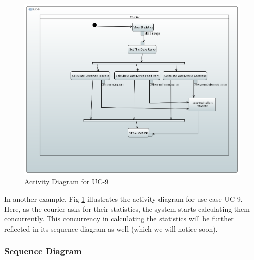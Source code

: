\begin{figure}[h!]
\begin{center}
\includegraphics[scale=0.35]{FIGS/UC-9.PNG}
    \caption{Activity Diagram for UC-9}
    \label{fig:act_diag9}
\end{center}
\end{figure}

In another example, Fig \ref{fig:act_diag9} illustrates the activity diagram for use case UC-9. Here, as the courier asks for their statistics, the system starts calculating them concurrently. This concurrency in calculating the statistics will be further reflected in its sequence diagram as well (which we will notice soon).

\subsubsection{Sequence Diagram} \label{seq_diag}

